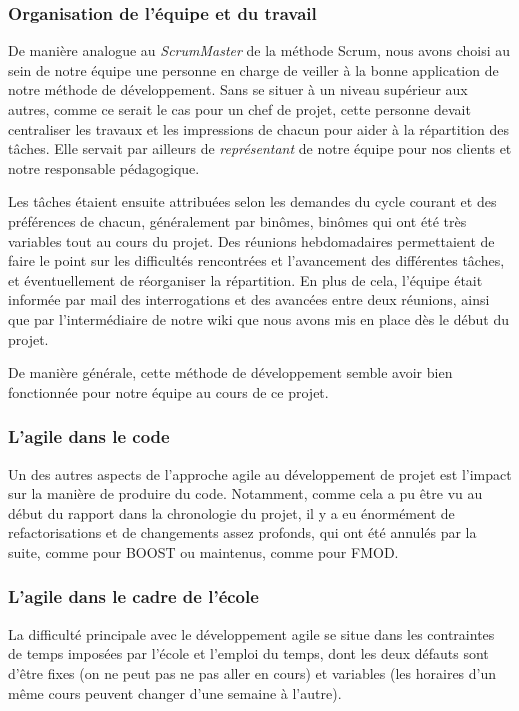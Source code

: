 \subsubsection{Organisation de l'équipe et du travail}

De manière analogue au \textit{ScrumMaster} de la méthode Scrum, nous avons choisi au sein de notre équipe une personne en charge de veiller à la bonne application de notre méthode de développement. Sans se situer à un niveau supérieur aux autres, comme ce serait le cas pour un chef de projet, cette personne devait centraliser les travaux et les impressions de chacun pour aider à la répartition des tâches. Elle servait par ailleurs de \textit{représentant} de notre équipe pour nos clients et notre responsable pédagogique.

Les tâches étaient ensuite attribuées selon les demandes du cycle courant et des préférences de chacun, généralement par binômes, binômes qui ont été très variables tout au cours du projet. Des réunions hebdomadaires permettaient de faire le point sur les difficultés rencontrées et l'avancement des différentes tâches, et éventuellement de réorganiser la répartition. En plus de cela, l'équipe était informée par mail des interrogations et des avancées entre deux réunions, ainsi que par l'intermédiaire de notre wiki que nous avons mis en place dès le début du projet.

De manière générale, cette méthode de développement semble avoir bien fonctionnée pour notre équipe au cours de ce projet.

\subsubsection{L'agile dans le code}
Un des autres aspects de l'approche agile au développement de projet est l'impact sur
la manière de produire du code. Notamment, comme cela a pu être vu au début du rapport dans la
chronologie du projet, il y a eu énormément de refactorisations et de changements assez profonds,
qui ont été annulés par la suite, comme pour BOOST ou maintenus, comme pour FMOD.

\subsubsection{L'agile dans le cadre de l'école}
La difficulté principale avec le développement agile se situe dans les contraintes de temps
imposées par l'école et l'emploi du temps, dont les deux défauts sont d'être fixes (on ne peut pas ne pas aller en cours)
et variables (les horaires d'un même cours peuvent changer d'une semaine à l'autre).


